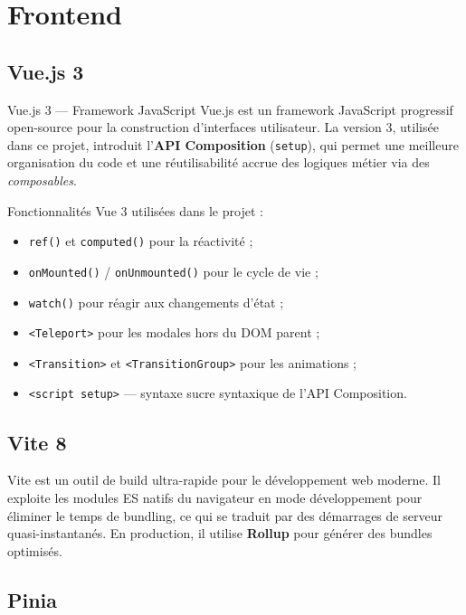 \documentclass[12pt, a4paper]{report}
\begin{document}
\section{Frontend}

\subsection{Vue.js 3}

\begin{techbox}{Vue.js 3 — Framework JavaScript}
Vue.js est un framework JavaScript progressif open-source pour la construction
d'interfaces utilisateur. La version 3, utilisée dans ce projet, introduit
l'\textbf{API Composition} (\texttt{setup}), qui permet une meilleure
organisation du code et une réutilisabilité accrue des logiques métier via
des \textit{composables}.
\end{techbox}

\medskip

Fonctionnalités Vue 3 utilisées dans le projet :
\begin{itemize}
  \item \texttt{ref()} et \texttt{computed()} pour la réactivité ;
  \item \texttt{onMounted()} / \texttt{onUnmounted()} pour le cycle de vie ;
  \item \texttt{watch()} pour réagir aux changements d'état ;
  \item \texttt{<Teleport>} pour les modales hors du DOM parent ;
  \item \texttt{<Transition>} et \texttt{<TransitionGroup>} pour les animations ;
  \item \texttt{<script setup>} — syntaxe sucre syntaxique de l'API Composition.
\end{itemize}

\subsection{Vite 8}

Vite est un outil de build ultra-rapide pour le développement web moderne.
Il exploite les modules ES natifs du navigateur en mode développement pour
éliminer le temps de bundling, ce qui se traduit par des démarrages de serveur
quasi-instantanés. En production, il utilise \textbf{Rollup} pour générer
des bundles optimisés.

\subsection{Pinia}
\end{document}
